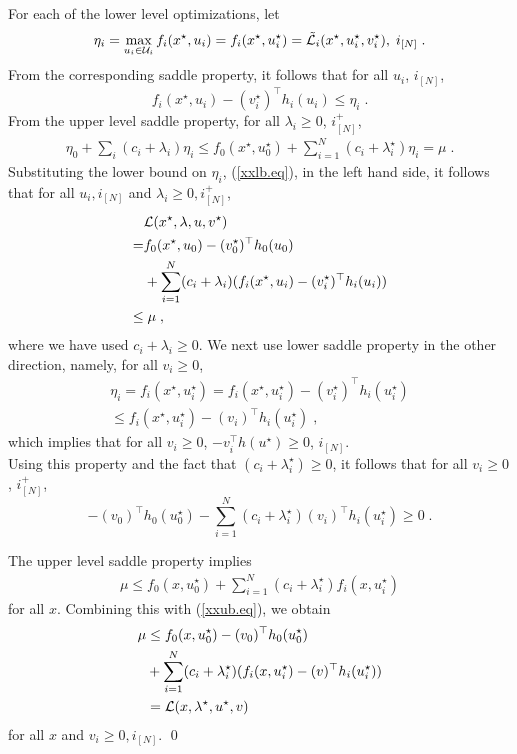 \documentclass[journal,twoside,web]{ieeecolor}
\begin{document}
\noindent
For each of the lower level optimizations, let
\begin{align*}
\eta_i=\max_{u_i\in {\cal U}_i}f_i(x^\star,u_i)=f_i(x^\star,u_i^\star)=
\tilde{\cal L}_i(x^\star,u_i^\star,v_i^\star),\; i_{[N]}\;.
\end{align*}
From the corresponding saddle property, it follows that for all $u_i$, $i_{[N]}$,
\begin{equation}\label{xxlb.eq}
f_i(x^\star,u_i)-(v_i^\star)^\top h_i(u_i)\leq \eta_i\;.
\end{equation}
From the upper level saddle property, for all $\lambda_i\geq 0$, $i^+_{[N]}$,
\begin{align*}
\eta_0+\sum_i(c_i+\lambda_i)\eta_i\leq f_0(x^\star,u_0^\star)+\sum_{i=1}^N(c_i+\lambda_i^\star)\eta_i=\mu\;.
\end{align*}
Substituting the lower bound on $\eta_i$, (\ref{xxlb.eq}), in the left hand side, it follows that for all $u_i, i_{[N]}$ and $\lambda_i\geq 0, i^+_{[N]}$,
\begin{align*}
&{\cal L}(x^\star,\lambda,u,v^\star)\\
= &f_0(x^\star,u_0)-(v_0^\star)^\top h_0(u_0)\\
& +\sum_{i=1}^
N(c_i+\lambda_i)(f_i(x^\star,u_i)-(v_i^\star)^\top h_i(u_i))\\
\leq &\;\mu\;,
\end{align*}
where we have used $c_i+\lambda_i\geq 0$. We next use lower saddle property in the other direction, namely, for all $v_i\geq 0$,
\begin{align*}
\eta_i=f_i(x^\star,u_i^\star)=f_i(x^\star,u_i^\star)-(v_i^\star)^\top h_i(u_i^\star)\\
\leq f_i(x^\star,u_i^\star)-(v_i)^\top h_i(u_i^\star)\;,
\end{align*}
which implies that for all $v_i\geq 0$, $-v_i^\top h(u^\star)\geq 0$, $i_{[N]}$.\\
Using this property and the fact that $(c_i+\lambda_i^\star)\geq 0$, it follows that for all $v_i\geq 0$, $i^+_{[N]}$,
\begin{equation}\label{xxub.eq}
-(v_0)^\top h_0(u_0^\star)-\sum_{i=1}^N(c_i+\lambda_i^\star)(v_i)^\top h_i(u_i^\star)\geq 0\;.
\end{equation}

\noindent
The upper level saddle property implies
\begin{align*}
\mu\leq f_0(x,u_0^\star)+\sum_{i=1}^N(c_i+\lambda_i^\star)f_i(x,u_i^\star)
\end{align*}
for all $x$. Combining this with (\ref{xxub.eq}), we obtain
\begin{align*}
\mu&\leq f_0(x,u_0^\star)-(v_0)^\top h_0(u_0^\star)\\
&+\sum_{i=1}^N(c_i+\lambda_i^\star)(f_i(x,u_i^\star)-(v)^\top h_i(u_i^\star))\\
&={\cal L}(x,\lambda^\star,u^\star,v)
\end{align*}
for all $x$ and $v_i\geq 0, i_{[N]}$.
\qed
\end{document}
